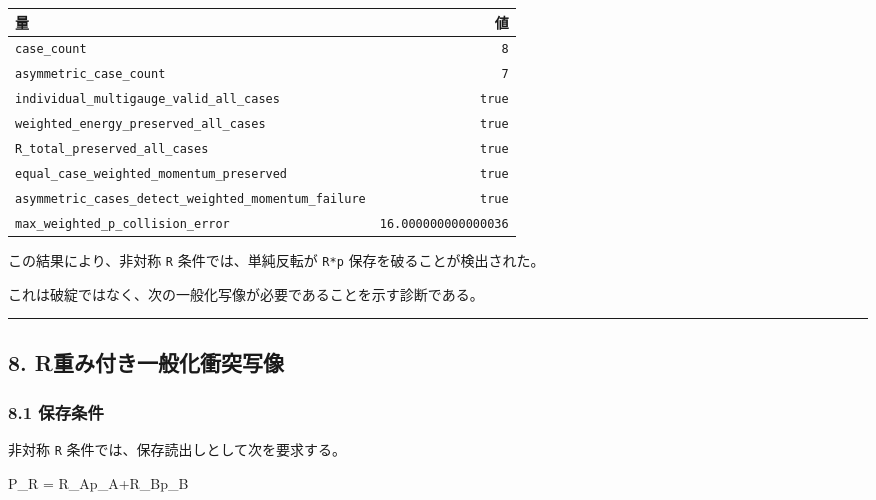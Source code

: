 \documentclass[
  a4paper,
]{article}
\newenvironment{Shaded}{}{}
\newcommand{\NormalTok}[1]{#1}
\newcounter{none} %
\begin{document}
{\def\LTcaptype{none} %
\begin{longtable}[]{@{}lr@{}}
\toprule\noalign{}
量 & 値 \\
\midrule\noalign{}
\endhead
\bottomrule\noalign{}
\endlastfoot
\texttt{case\_count} & \texttt{8} \\
\texttt{asymmetric\_case\_count} & \texttt{7} \\
\texttt{individual\_multigauge\_valid\_all\_cases} & \texttt{true} \\
\texttt{weighted\_energy\_preserved\_all\_cases} & \texttt{true} \\
\texttt{R\_total\_preserved\_all\_cases} & \texttt{true} \\
\texttt{equal\_case\_weighted\_momentum\_preserved} & \texttt{true} \\
\texttt{asymmetric\_cases\_detect\_weighted\_momentum\_failure} &
\texttt{true} \\
\texttt{max\_weighted\_p\_collision\_error} &
\texttt{16.000000000000036} \\
\end{longtable}
}

この結果により、非対称 \texttt{R} 条件では、単純反転が \texttt{R*p}
保存を破ることが検出された。

これは破綻ではなく、次の一般化写像が必要であることを示す診断である。

\begin{center}\rule{0.5\linewidth}{0.5pt}\end{center}

\subsection{8.
R重み付き一般化衝突写像}\label{rux91cdux307fux4ed8ux304dux4e00ux822cux5316ux885dux7a81ux5199ux50cf}

\subsubsection{8.1 保存条件}\label{ux4fddux5b58ux6761ux4ef6}

非対称 \texttt{R} 条件では、保存読出しとして次を要求する。

\begin{Shaded}
\begin{Highlighting}[]
\NormalTok{P\_R}
\NormalTok{=}
\NormalTok{R\_Ap\_A+R\_Bp\_B}
\end{Highlighting}
\end{Shaded}
\end{document}
